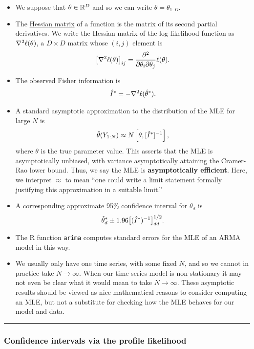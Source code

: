 \documentclass[]{article}
\begin{document}
\begin{itemize}
\item
  We suppose that \(\theta\in\mathbb{R}^D\) and so we can write
  \(\theta=\theta_{1:D}\).
\item
  The \href{https://en.wikipedia.org/wiki/Hessian_matrix}{Hessian
  matrix} of a function is the matrix of its second partial derivatives.
  We write the Hessian matrix of the log likelihood function as
  \(\nabla^2\ell(\theta)\), a \(D\times D\) matrix whose \((i,j)\)
  element is
  \[ \big[\nabla^2\ell(\theta)\big]_{ij} =  \frac{\partial^2}{\partial\theta_i\partial\theta_j}\ell(\theta).\]
\item
  The observed Fisher information is
  \[ \hat{I}^* = - \nabla^2\ell(\hat\theta^*).\]
\item
  A standard asymptotic approximation to the distribution of the MLE for
  large \(N\) is \[
  \hat\theta(Y_{1:N}) \approx N\left[\theta, [\hat{I}^*]^{-1}\right],
  \] where \(\theta\) is the true parameter value. This asserts that the
  MLE is asymptotically unbiased, with variance asymptotically attaining
  the Cramer-Rao lower bound. Thus, we say the MLE is
  \textbf{asymptotically efficient}. Here, we interpret \(\approx\) to
  mean ``one could write a limit statement formally justifying this
  approximation in a suitable limit.''
\item
  A corresponding approximate 95\% confidence interval for \(\theta_d\)
  is
  \[ \hat\theta_d^* \pm 1.96 \big[({\hat{I}^*})^{-1}\big]_{dd}^{1/2}.\]
\item
  The R function \texttt{arima} computes standard errors for the MLE of
  an ARMA model in this way.
\item
  We usually only have one time series, with some fixed \(N\), and so we
  cannot in practice take \(N\to\infty\). When our time series model is
  non-stationary it may not even be clear what it would mean to take
  \(N\to\infty\). These asymptotic results should be viewed as nice
  mathematical reasons to consider computing an MLE, but not a
  substitute for checking how the MLE behaves for our model and data.
\end{itemize}

\begin{center}\rule{0.5\linewidth}{\linethickness}\end{center}

\subsubsection{Confidence intervals via the profile
likelihood}\label{confidence-intervals-via-the-profile-likelihood}
\end{document}
